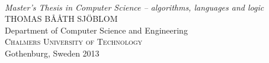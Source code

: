 \begin{titlepage} %

\mbox{}
\vfill
\addtolength{\voffset}{2cm}
\begin{flushleft}
	{ \\[0.5cm]
	\emph{\Large Master's Thesis in Computer Science -- algorithms, languages and logic} \\[.8cm]%
	
	{\huge THOMAS B\AA\AA{}TH SJ\"{O}BLOM}\\[.8cm]
	
	{\Large Department of Computer Science and Engineering \\
	\textsc{Chalmers University of Technology} \\
	Gothenburg, Sweden 2013 \\
	} 
	}
\end{flushleft}

\end{titlepage}
\ClearShipoutPicture

\pagestyle{empty}
\newpage
\clearpage
\mbox{}
\newpage
\clearpage
\thispagestyle{empty}

\newpage
\clearpage

\newpage
\clearpage



